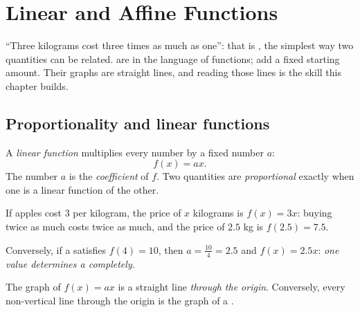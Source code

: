 \chapter{Linear and Affine Functions}\label{ch:g9:linfunc}

``Three kilograms cost three times as much as one'': that is
, the simplest way two quantities can be related.  are  in the language of functions;  add a fixed starting amount. Their graphs are straight lines,
and reading those lines is the skill this chapter builds.

\section{Proportionality and linear functions}

\begin{definition}\label{def:g9:linfunc:linear}
A \emph{linear function} multiplies every number
by a fixed number $a$:
\[
f(x) = a x .
\]
The number $a$ is the \emph{coefficient} of $f$. Two quantities are
\emph{proportional} exactly when one is a linear
function of the other.
\end{definition}

\begin{example}\label{ex:g9:linfunc:linear}
If apples cost $3$ per kilogram, the price of $x$ kilograms is
$f(x) = 3x$: buying twice as much costs twice as much, and the price of
$2.5$ kg is $f(2.5) = 7.5$.

Conversely, if a  satisfies $f(4) = 10$, then
$a = \frac{10}{4} = 2.5$ and $f(x) = 2.5x$: \emph{one value determines a
 completely.}
\end{example}

\begin{proposition}\label{prop:g9:linfunc:lineargraph}
The graph of $f(x) = ax$ is a straight line \emph{through the origin}.
Conversely, every non-vertical line through the origin is the graph of a
.
\end{proposition}
\admitted


